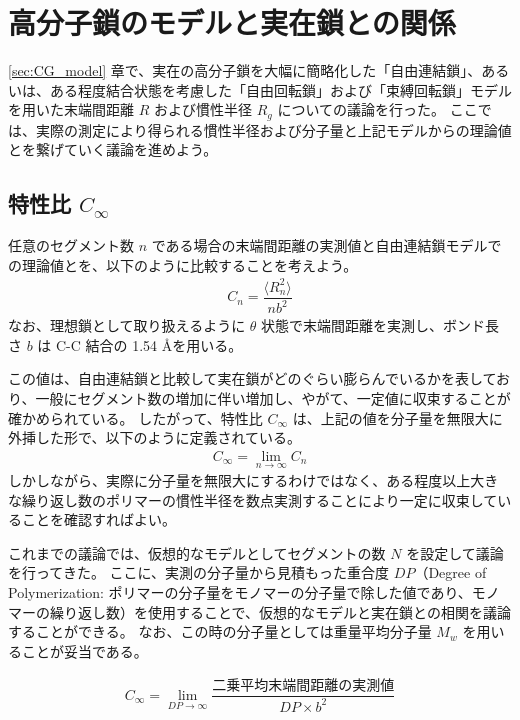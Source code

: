 \documentclass[a4paper,11pt]{ltjsarticle}
\begin{document}
\newpage

\section{高分子鎖のモデルと実在鎖との関係}

\ref{sec:CG_model} 章で、実在の高分子鎖を大幅に簡略化した「自由連結鎖」、あるいは、ある程度結合状態を考慮した「自由回転鎖」および「束縛回転鎖」モデルを用いた末端間距離 $R$ および慣性半径 $R_g$ についての議論を行った。
ここでは、実際の測定により得られる慣性半径および分子量と上記モデルからの理論値とを繋げていく議論を進めよう。


\subsection{特性比 $C_{\infty}$}

任意のセグメント数 $n$ である場合の末端間距離の実測値と自由連結鎖モデルでの理論値とを、以下のように比較することを考えよう。
\begin{align}
C_n=\dfrac{ \langle R_n^2 \rangle }{n b^2}
\end{align}
なお、理想鎖として取り扱えるように $\theta$ 状態で末端間距離を実測し、ボンド長さ $b$ は C-C 結合の 1.54 \AA を用いる。

この値は、自由連結鎖と比較して実在鎖がどのぐらい膨らんでいるかを表しており、一般にセグメント数の増加に伴い増加し、やがて、一定値に収束することが確かめられている。
したがって、特性比 $C_{\infty}$ は、上記の値を分子量を無限大に外挿した形で、以下のように定義されている。
\begin{align}
C_{\infty}=\lim_{n \to \infty} C_n 
\label{fig:CR}
\end{align}
しかしながら、実際に分子量を無限大にするわけではなく、ある程度以上大きな繰り返し数のポリマーの慣性半径を数点実測することにより一定に収束していることを確認すればよい。

これまでの議論では、仮想的なモデルとしてセグメントの数 $N$ を設定して議論を行ってきた。
ここに、実測の分子量から見積もった重合度 $DP$（Degree of Polymerization: ポリマーの分子量をモノマーの分子量で除した値であり、モノマーの繰り返し数）を使用することで、仮想的なモデルと実在鎖との相関を議論することができる。
なお、この時の分子量としては重量平均分子量 $M_w$ を用いることが妥当である。

\begin{align}
C_{\infty} = \lim_{DP \to \infty} \dfrac{ \text{二乗平均末端間距離の実測値} }{DP \times b^2}
\label{fig:CR}
\end{align}
\end{document}
